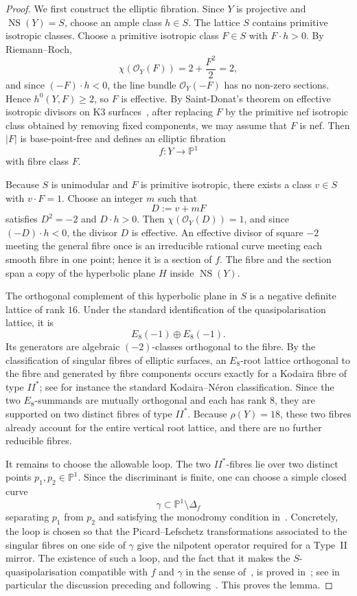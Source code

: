 \documentclass[11pt]{article}
\theoremstyle{remark}
\numberwithin{equation}{section}
\begin{document}
\begin{proof}
We first construct the elliptic fibration. Since \(Y\) is projective and \(\operatorname{NS}(Y)=S\), choose an ample class \(h\in S\). The lattice \(S\) contains primitive isotropic classes. Choose a primitive isotropic class \(F\in S\) with \(F\cdot h>0\). By Riemann--Roch,
\[
\chi(\mathcal O_Y(F))=2+\frac{F^2}{2}=2,
\]
and since \((-F)\cdot h<0\), the line bundle \(\mathcal O_Y(-F)\) has no non-zero sections. Hence \(h^0(Y,F)\ge 2\), so \(F\) is effective. By Saint-Donat's theorem on effective isotropic divisors on K3 surfaces~\cite[Théorème~5.1]{SD74}, after replacing \(F\) by the primitive nef isotropic class obtained by removing fixed components, we may assume that \(F\) is nef. Then \(|F|\) is base-point-free and defines an elliptic fibration
\[
f\colon Y\to \mathbb P^1
\]
with fibre class \(F\).

Because \(S\) is unimodular and \(F\) is primitive isotropic, there exists a class \(v\in S\) with \(v\cdot F=1\). Choose an integer \(m\) such that
\[
D:=v+mF
\]
satisfies \(D^2=-2\) and \(D\cdot h>0\). Then \(\chi(\mathcal O_Y(D))=1\), and since \((-D)\cdot h<0\), the divisor \(D\) is effective. An effective divisor of square \(-2\) meeting the general fibre once is an irreducible rational curve meeting each smooth fibre in one point; hence it is a section of \(f\). The fibre and the section span a copy of the hyperbolic plane \(H\) inside \(\operatorname{NS}(Y)\).

The orthogonal complement of this hyperbolic plane in \(S\) is a negative definite lattice of rank \(16\). Under the standard identification of the quasipolarisation lattice, it is
\[
E_8(-1)\oplus E_8(-1).
\]
Its generators are algebraic \((-2)\)-classes orthogonal to the fibre. By the classification of singular fibres of elliptic surfaces, an \(E_8\)-root lattice orthogonal to the fibre and generated by fibre components occurs exactly for a Kodaira fibre of type \(II^*\); see for instance the standard Kodaira--Néron classification. Since the two \(E_8\)-summands are mutually orthogonal and each has rank \(8\), they are supported on two distinct fibres of type \(II^*\). Because \(\rho(Y)=18\), these two fibres already account for the entire vertical root lattice, and there are no further reducible fibres.

It remains to choose the allowable loop. The two \(II^*\)-fibres lie over two distinct points \(p_1,p_2\in \mathbb P^1\). Since the discriminant is finite, one can choose a simple closed curve
\[
\gamma\subset \mathbb P^1\setminus \Delta_f
\]
separating \(p_1\) from \(p_2\) and satisfying the monodromy condition in~\cite[Definition~4.11]{dfk3slpms}. Concretely, the loop is chosen so that the Picard--Lefschetz transformations associated to the singular fibres on one side of \(\gamma\) give the nilpotent operator required for a Type~II mirror. The existence of such a loop, and the fact that it makes the \(S\)-quasipolarisation compatible with \(f\) and \(\gamma\) in the sense of~\cite[Definition~4.21]{dfk3slpms}, is proved in~\cite[\S4]{dfk3slpms}; see in particular the discussion preceding and following~\cite[Definition~4.21]{dfk3slpms}. This proves the lemma.
\end{proof}
\end{document}
